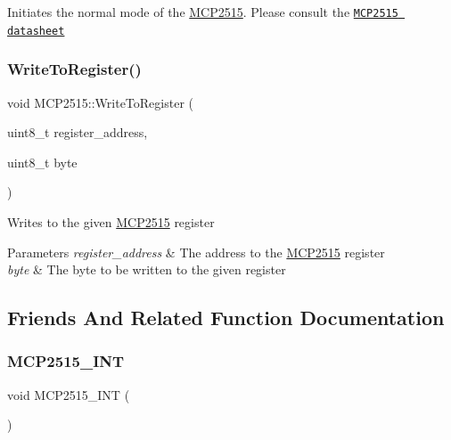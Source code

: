 Initiates the normal mode of the \hyperlink{class_m_c_p2515}{M\+C\+P2515}. Please consult the \href{http://ww1.microchip.com/downloads/en/DeviceDoc/21801G.pdf}{\tt M\+C\+P2515 datasheet} \hypertarget{class_m_c_p2515_adbc005a5975b77b0aef74363f3832f9b}{}\label{class_m_c_p2515_adbc005a5975b77b0aef74363f3832f9b} 
\subsubsection{\texorpdfstring{Write\+To\+Register()}{WriteToRegister()}}
{\footnotesize\ttfamily void M\+C\+P2515\+::\+Write\+To\+Register (\begin{DoxyParamCaption}\item[{uint8\+\_\+t}]{register\+\_\+address,  }\item[{uint8\+\_\+t}]{byte }\end{DoxyParamCaption})\hspace{0.3cm}{\ttfamily [private]}}

Writes to the given \hyperlink{class_m_c_p2515}{M\+C\+P2515} register 
\begin{DoxyParams}{Parameters}
{\em register\+\_\+address} & The address to the \hyperlink{class_m_c_p2515}{M\+C\+P2515} register \\
\hline
{\em byte} & The byte to be written to the given register \\
\hline
\end{DoxyParams}


\subsection{Friends And Related Function Documentation}
\hypertarget{class_m_c_p2515_a3e97befdad3bb95f1da9cf6ff507febe}{}\label{class_m_c_p2515_a3e97befdad3bb95f1da9cf6ff507febe} 
\subsubsection{\texorpdfstring{M\+C\+P2515\+\_\+\+I\+NT}{MCP2515\_INT}}
{\footnotesize\ttfamily void M\+C\+P2515\+\_\+\+I\+NT (\begin{DoxyParamCaption}{ }\end{DoxyParamCaption})\hspace{0.3cm}{\ttfamily [friend]}}

